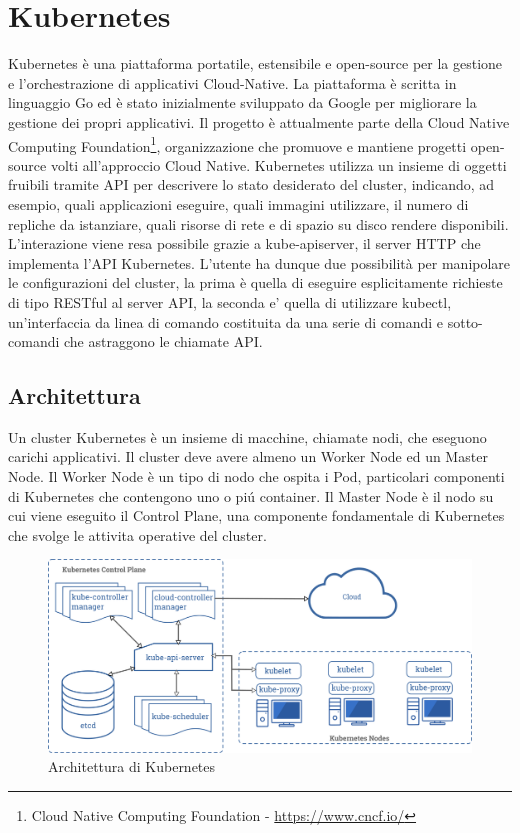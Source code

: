 
\section{Kubernetes}
Kubernetes è una piattaforma portatile, estensibile e open-source per la gestione e l'orchestrazione di applicativi Cloud-Native.
La piattaforma è scritta in linguaggio Go ed è stato inizialmente sviluppato da Google per migliorare la gestione dei propri applicativi. Il progetto è attualmente parte della Cloud Native Computing Foundation\footnote{Cloud Native Computing Foundation - \url{https://www.cncf.io/}}, organizzazione che promuove e mantiene progetti open-source volti all'approccio Cloud Native.
Kubernetes utilizza un insieme di oggetti fruibili tramite API per descrivere lo stato desiderato del cluster, indicando, ad esempio, quali applicazioni eseguire, quali immagini utilizzare, il numero di repliche da istanziare, quali risorse di rete e di spazio su disco rendere disponibili. L'interazione viene resa possibile grazie a kube-apiserver, il server HTTP che implementa l'API Kubernetes. L'utente ha dunque due possibilità per manipolare le configurazioni del cluster, la prima è quella di eseguire esplicitamente richieste di tipo RESTful al server API, la seconda e' quella di utilizzare kubectl, un'interfaccia da linea di comando costituita da una serie di comandi e sotto-comandi che astraggono le chiamate API.
\subsection{Architettura}
Un cluster Kubernetes è un insieme di macchine, chiamate nodi, che eseguono carichi applicativi. Il cluster deve avere almeno un Worker Node ed un Master Node. Il Worker Node è un tipo di nodo che ospita i Pod, particolari componenti di Kubernetes che contengono uno o piú container. Il Master Node è il nodo su cui viene eseguito il Control Plane, una componente fondamentale di Kubernetes che svolge le attivita operative del cluster.

\begin{figure}[H]
 \centering
 \includegraphics[width=1.0\textwidth]{./Figure/Kubernetes_Architettura.png}
 \caption{Architettura di Kubernetes}
 \label{fig:Architettura}
\end{figure}

